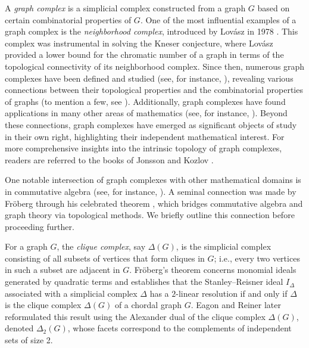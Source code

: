 \documentclass[11pt,reqno,a4paper]{amsart}
\theoremstyle{definition}
\theoremstyle{theorem}
\theoremstyle{remark}
\begin{document}
A \emph{graph complex} is a simplicial complex constructed from a graph $G$ based on certain combinatorial properties of $G$. One of the most influential examples of a graph complex is the \emph{neighborhood complex}, introduced by Lov{\'a}sz in 1978 \cite{lovasz1978}. This complex was instrumental in solving the Kneser conjecture, where Lov{\' a}sz provided a lower bound for the chromatic number of a graph in terms of the topological connectivity of its neighborhood complex. Since then, numerous graph complexes have been defined and studied (see, for instance, \cite{Henryvietoris, BK06, Barmakstarclusters,  Singh20, Singhhighermatching, Wachschessboard}), revealing various connections between their topological properties and the combinatorial properties of graphs (to mention a few, see \cite{Alonchromatic, Bjornercombinatorial, deshpandedomination, DS12, matsushita2023dominance, Meshulamdomination}). Additionally, graph complexes have found applications in many other areas of mathematics (see, for instance, \cite{Aharoniindependent, Bright04, camara2016topological, chanviralevolution, Dochtermannwarmath}). Beyond these connections, graph complexes have emerged as significant objects of study in their own right, highlighting their independent mathematical interest. For more comprehensive insights into the intrinsic topology of graph complexes, readers are referred to the books of Jonsson \cite{jonsson2008simplicial} and Kozlov \cite{kozlovCombAlgTopo}.

One notable intersection of graph complexes with other mathematical domains is in commutative algebra (see, for instance, \cite{Dochter09, dochter12, hibi92, hoch16, Stan96, van13}). A seminal connection was made by Fr{\"o}berg through his celebrated theorem \cite[Theorem 1]{froberg1990}, which bridges commutative algebra and graph theory via topological methods. 
We briefly outline this connection before proceeding further. 

For a graph $G$, the \emph{clique complex}, say $\Delta(G)$, is the simplicial complex consisting of all subsets of vertices that form cliques in $G$; i.e., every two vertices in such a subset are adjacent in $G$. Fr{\"o}berg’s theorem concerns monomial ideals generated by quadratic terms and establishes that the Stanley–Reisner ideal $I_\Delta$ associated with a simplicial complex $\Delta$ has a $2$-linear resolution if and only if $\Delta$ is the clique complex $\Delta(G)$ of a chordal graph $G$. 
Eagon and Reiner later reformulated \cite[Proposition 8]{ER98} this result using the Alexander dual of the clique complex $\Delta(G)$, denoted $\Delta_2(G)$, whose facets correspond to the complements of independent sets of size 2. 
\end{document}

